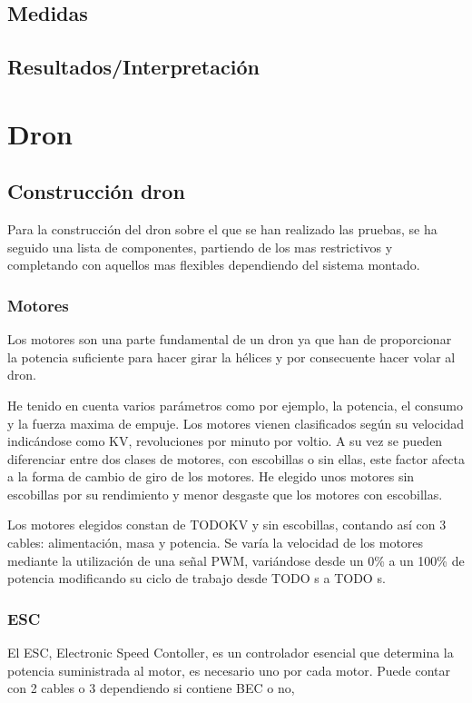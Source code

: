 \documentclass[spanish]{book}
\begin{document}
            
            \subsection{Medidas}
            
            \subsection{Resultados/Interpretación}
            
        \section{Dron}
            \subsection{Construcción dron}
            Para la construcción del dron sobre el que se han realizado las pruebas, se ha seguido una lista de componentes, partiendo de los mas restrictivos y completando con aquellos mas flexibles dependiendo del sistema montado.
                \subsubsection{Motores}
                Los motores son una parte fundamental de un dron ya que han de proporcionar la potencia suficiente para hacer girar la hélices y por consecuente hacer volar al dron. 
                
                He tenido en cuenta varios parámetros como por ejemplo, la potencia, el consumo y la fuerza maxima de empuje. Los motores vienen clasificados según su velocidad indicándose como KV, revoluciones por minuto por voltio. A su vez se pueden diferenciar entre dos clases de motores, con escobillas o sin ellas, este factor afecta a la forma de cambio de giro de los motores. He elegido unos motores sin escobillas por su rendimiento y menor desgaste que los motores con escobillas. 
                
                Los motores elegidos constan de TODOKV y sin escobillas, contando así con 3 cables: alimentación, masa y potencia. Se varía la velocidad de los motores mediante la utilización de una señal PWM, variándose desde un 0\% a un 100\% de potencia modificando su ciclo de trabajo desde TODO s a TODO s.
                \subsubsection{ESC}
                El ESC, Electronic Speed Contoller, es un controlador esencial que determina la potencia suministrada al motor, es necesario uno por cada motor. Puede contar con 2 cables o 3 dependiendo si contiene BEC o no, 
\end{document}

